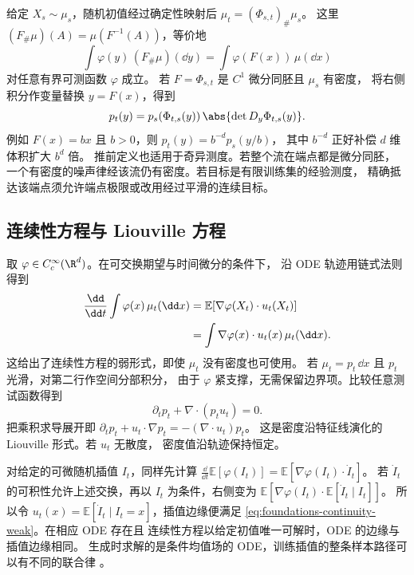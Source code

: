 给定 \(X_s\sim\mu_s\)，随机初值经过确定性映射后
\(\mu_t=(\Phi_{s,t})_\#\mu_s\)。
这里 \((F_\#\mu)(A)=\mu(F^{-1}(A))\)，等价地
\[
  \int\varphi(y)\,(F_\#\mu)(\dd y)=\int\varphi(F(x))\,\mu(\dd x)
\]
对任意有界可测函数 \(\varphi\) 成立。
若 \(F=\Phi_{s,t}\) 是 \(C^1\) 微分同胚且 \(\mu_s\) 有密度，
将右侧积分作变量替换 \(y=F(x)\)，得到
\begin{equation}
  p_t(y)=p_s(\Phi_{t,s}(y))\,\abs{\det D_y\Phi_{t,s}(y)} .
  \label{eq:foundations-change-variables}
\end{equation}
例如 \(F(x)=b x\) 且 \(b>0\)，则 \(p_t(y)=b^{-d}p_s(y/b)\)，
其中 \(b^{-d}\) 正好补偿 \(d\) 维体积扩大 \(b^d\) 倍。
推前定义也适用于奇异测度。若整个流在端点都是微分同胚，
一个有密度的噪声律经该流仍有密度。若目标是有限训练集的经验测度，
精确抵达该端点须允许端点极限或改用经过平滑的连续目标。

\subsection{连续性方程与 Liouville 方程\requiredderivation}

取 \(\varphi\in C_c^\infty(\R^d)\)。在可交换期望与时间微分的条件下，
沿 ODE 轨迹用链式法则得到
\begin{align}
  \frac{\dd}{\dd t}\int \varphi(x)\,\mu_t(\dd x)
    &=\mathbb E[\nabla\varphi(X_t)\cdot u_t(X_t)]\notag\\
    &=\int \nabla\varphi(x)\cdot u_t(x)\,\mu_t(\dd x).
    \label{eq:foundations-continuity-weak}
\end{align}
这给出了连续性方程的弱形式，即使 \(\mu_t\) 没有密度也可使用。
若 \(\mu_t=p_t\,\dd x\) 且 \(p_t\) 光滑，对第二行作空间分部积分，
由于 \(\varphi\) 紧支撑，无需保留边界项。比较任意测试函数得到
\begin{equation}
  \boxed{\partial_t p_t+\nabla\cdot(p_tu_t)=0.}
  \label{eq:foundations-continuity}
\end{equation}
把乘积求导展开即
\(\partial_t p_t+u_t\cdot\nabla p_t=-(\nabla\cdot u_t)p_t\)。
这是密度沿特征线演化的 Liouville 形式。若 \(u_t\) 无散度，
密度值沿轨迹保持恒定。

对给定的可微随机插值 \(I_t\)，同样先计算
\(\frac{\dd}{\dd t}\mathbb E[\varphi(I_t)]
=\mathbb E[\nabla\varphi(I_t)\cdot\dot I_t]\)。
若 \(\dot I_t\) 的可积性允许上述交换，再以 \(I_t\) 为条件，右侧变为
\(\mathbb E[\nabla\varphi(I_t)\cdot\mathbb E[\dot I_t\mid I_t]]\)。
所以令 \(u_t(x)=\mathbb E[\dot I_t\mid I_t=x]\)，插值边缘便满足
\eqref{eq:foundations-continuity-weak}。在相应 ODE 存在且
连续性方程以给定初值唯一可解时，ODE 的边缘与插值边缘相同。
生成时求解的是条件均值场的 ODE，训练插值的整条样本路径可以有不同的联合律
\cite{lipman2023fm,albergo2025si}。

